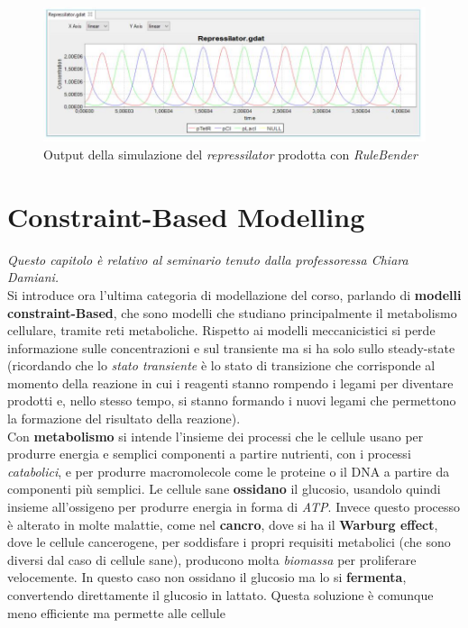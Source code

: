 \documentclass[a4paper,12pt, oneside]{book}
\begin{document}
\begin{figure}
  \centering
  \includegraphics[scale = 0.4]{img/rulb2.jpg}
  \caption{Output della simulazione del \textit{repressilator} prodotta con
    \textit{RuleBender}}
  \label{fig:ruleb2}
\end{figure}
\chapter{Constraint-Based Modelling}
\textit{Questo capitolo è relativo al seminario tenuto dalla professoressa
  Chiara Damiani.}\\
Si introduce ora l'ultima categoria di modellazione del corso, parlando di
\textbf{modelli constraint-Based}, che sono modelli che studiano principalmente
il metabolismo cellulare, tramite reti metaboliche. Rispetto ai modelli
meccanicistici si perde informazione sulle concentrazioni e sul transiente ma
si ha solo sullo steady-state (ricordando che lo \textit{stato transiente} è lo 
stato di transizione che corrisponde al momento della reazione in cui i reagenti
stanno rompendo i legami per diventare prodotti e, nello stesso tempo, si stanno
formando i nuovi legami che permettono la formazione del risultato della
reazione). \\
Con \textbf{metabolismo} si intende l'insieme dei processi che le cellule usano
per produrre energia e semplici componenti a partire nutrienti, con i processi
\textit{catabolici}, e 
per produrre macromolecole come le proteine o il DNA a partire da componenti più
semplici. Le cellule sane \textbf{ossidano} il glucosio, usandolo quindi insieme
all'ossigeno per produrre energia in forma di \textit{ATP}. Invece questo
processo è 
alterato in molte malattie, come nel \textbf{cancro}, dove si ha il
\textbf{Warburg 
  effect}, dove le cellule cancerogene, per soddisfare i propri requisiti
metabolici (che sono diversi dal caso di cellule sane), producono molta
\textit{biomassa} per proliferare velocemente. In questo caso non ossidano il
glucosio ma lo si \textbf{fermenta}, convertendo direttamente il glucosio in
lattato. Questa soluzione è comunque meno efficiente ma permette alle cellule
\end{document}
